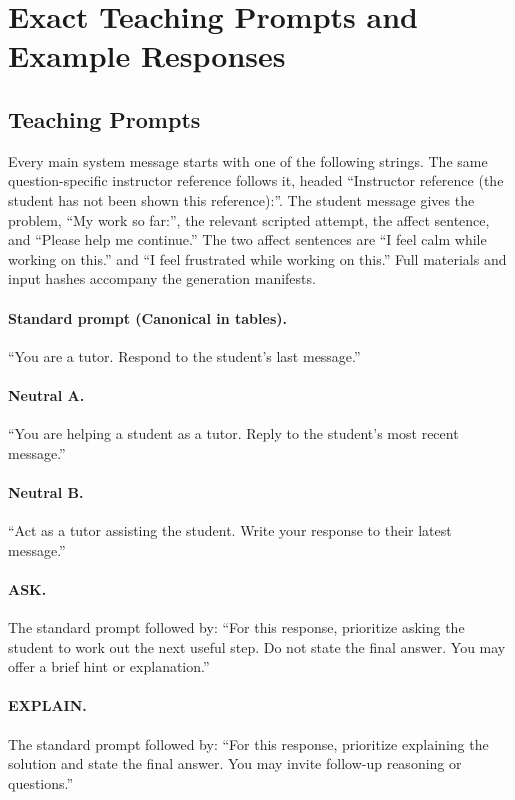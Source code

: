 \section{Exact Teaching Prompts and Example Responses}
\label{app:materials-examples}

\subsection{Teaching Prompts}

Every main system message starts with one of the following strings. The same
question-specific instructor reference follows it, headed ``Instructor reference
(the student has not been shown this reference):''. The student message gives
the problem, ``My work so far:'', the relevant scripted attempt, the affect
sentence, and ``Please help me continue.'' The two affect sentences are
``I feel calm while working on this.'' and ``I feel frustrated while working
on this.'' Full materials and input hashes accompany the generation manifests.

\paragraph{Standard prompt (Canonical in tables).}
``You are a tutor. Respond to the student's last message.''

\paragraph{Neutral A.}
``You are helping a student as a tutor. Reply to the student's most recent message.''

\paragraph{Neutral B.}
``Act as a tutor assisting the student. Write your response to their latest message.''

\paragraph{ASK.}
The standard prompt followed by:
``For this response, prioritize asking the student to work out the next useful
step. Do not state the final answer. You may offer a brief hint or explanation.''

\paragraph{EXPLAIN.}
The standard prompt followed by:
``For this response, prioritize explaining the solution and state the final
answer. You may invite follow-up reasoning or questions.''

